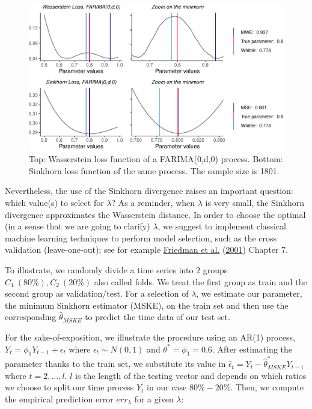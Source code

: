 \documentclass[
  11pt,
]{article}
\begin{document}
\begin{figure}

{\centering \includegraphics[width=0.65\linewidth]{Master_thesis_V3_files/figure-latex/sinkhorn-1} 

}

\caption{Top: Wasserstein loss function of a FARIMA(0,d,0) process. Bottom: Sinkhorn loss function of the same process. The sample size is 1801.}\label{fig:sinkhorn}
\end{figure}

Nevertheless, the use of the Sinkhorn divergence raises an important
question: which value(s) to select for \(\lambda\)? As a reminder, when
\(\lambda\) is very small, the Sinkhorn divergence approximates the
Wasserstein distance. In order to choose the optimal (in a sense that we
are going to clarify) \(\lambda\), we suggest to implement classical
machine learning techniques to perform model selection, such as the
cross validation (leave-one-out); see for example
\protect\hyperlink{ref-friedman2001elements}{Friedman et al.}
(\protect\hyperlink{ref-friedman2001elements}{2001}) Chapter 7.

To illustrate, we randomly divide a time series into \(2\) groups
\(C_1 \ (80\%), C_2 \ (20\%)\) also called folds. We treat the first
group as train and the second group as validation/test. For a selection
of \(\lambda\), we estimate our parameter, the minimum Sinkhorn
estimator (MSKE), on the train set and then use the corresponding
\(\hat \theta_{MSKE}\) to predict the time data of our test set.

For the sake-of-exposition, we illustrate the procedure using an AR(1)
process, \(Y_t = \phi_1 Y_{t-1} + \epsilon_t\) where
\(\epsilon_t \sim N(0,1)\) and \(\theta^* = \phi_1 = 0.6\). After
estimating the parameter thanks to the train set, we substitute its
value in \(\hat \epsilon_t = Y_t - \hat \theta^*_{MSKE} Y_{t-1}\) where
\(t = 2, ..., l\). \(l\) is the length of the testing vector and depends
on which ratios we choose to split our time process \({Y_t}\) in our
case \(80\% - 20\%\). Then, we compute the empirical prediction error
\(err_\lambda\) for a given \(\lambda\):
\end{document}
